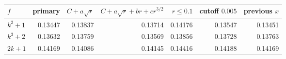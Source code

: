 \begin{tabular}{lrrrrrr}
\toprule
$f$ & primary & $C+a\sqrt r$ & $C+a\sqrt r+br+cr^{3/2}$ & $r\le 0.1$ & cutoff $0.005$ & previous $x$ \\
\midrule
$k^2+1$ & 0.13447 & 0.13837 & 0.13714 & 0.14176 & 0.13547 & 0.13451 \\
$k^3+2$ & 0.13632 & 0.13759 & 0.13569 & 0.13856 & 0.13728 & 0.13763 \\
$2k+1$ & 0.14169 & 0.14086 & 0.14145 & 0.14416 & 0.14188 & 0.14169 \\
\bottomrule
\end{tabular}
